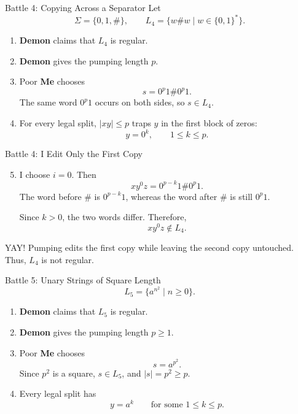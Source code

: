 \documentclass[10pt,aspectratio=169]{beamer}
\newcommand{\Demon}{\textbf{\alert{Demon}}}
\newcommand{\Me}{\textbf{\color{blue!70!black}Me}}
\begin{document}
\begin{frame}{Battle 4: Copying Across a Separator}
\small
Let
\[
\Sigma=\{0,1,\#\},
\qquad
L_4=\{w\#w\mid w\in\{0,1\}^*\}.
\]

\begin{enumerate}
    \item \Demon{} claims that $L_4$ is regular.
    \item \Demon{} gives the pumping length $p$.
    \item Poor \Me{} chooses
    \[
    s=0^p1\#0^p1.
    \]
    The same word $0^p1$ occurs on both sides, so $s\in L_4$.
    \item For every legal split, $|xy|\leq p$ traps $y$ in the first
          block of zeros:
    \[
    y=0^k,
    \qquad 1\leq k\leq p.
    \]
\end{enumerate}
\end{frame}

\begin{frame}{Battle 4: I Edit Only the First Copy}
\small
\begin{enumerate}
    \setcounter{enumi}{4}
    \item I choose $i=0$. Then
    \[
    xy^0z=0^{p-k}1\#0^p1.
    \]
    The word before $\#$ is $0^{p-k}1$, whereas the word after $\#$ is
    still $0^p1$.

    Since $k>0$, the two words differ. Therefore,
    \[
    xy^0z\notin L_4.
    \]
\end{enumerate}

\begin{block}{YAY!}
Pumping edits the first copy while leaving the second copy untouched.
Thus, $L_4$ is not regular.
\end{block}
\end{frame}

\begin{frame}{Battle 5: Unary Strings of Square Length}
\small
\[
L_5=\{a^{n^2}\mid n\geq 0\}.
\]

\begin{enumerate}
    \item \Demon{} claims that $L_5$ is regular.
    \item \Demon{} gives the pumping length $p\geq 1$.
    \item Poor \Me{} chooses
    \[
    s=a^{p^2}.
    \]
    Since $p^2$ is a square, $s\in L_5$, and $|s|=p^2\geq p$.
    \item Every legal split has
    \[
    y=a^k
    \qquad\text{for some }1\leq k\leq p.
    \]
\end{enumerate}
\end{frame}
\end{document}
